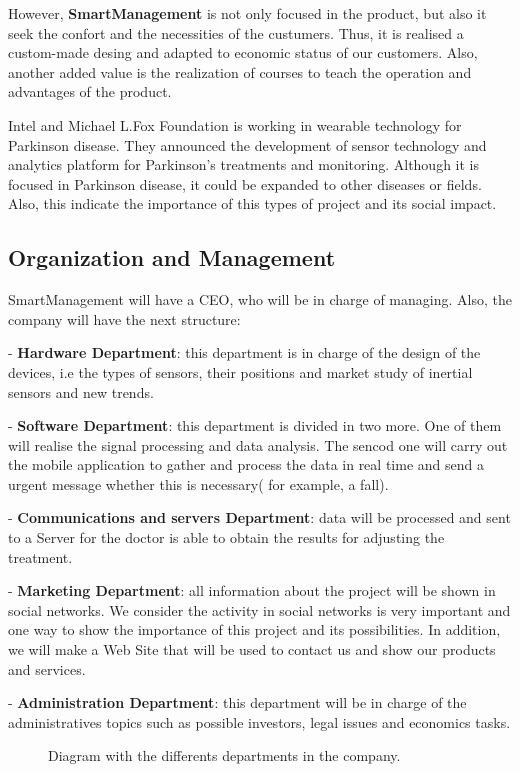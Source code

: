  However, \textbf{SmartManagement} is not only focused in the product, but also it seek the confort and the necessities of the custumers. Thus, it is realised a custom-made desing and adapted to economic status of our customers. Also, another added value is the realization of courses to teach the operation and advantages of the product.
 
 Intel and Michael L.Fox Foundation is working in wearable technology for Parkinson disease. They announced the development of sensor technology and analytics platform for Parkinson’s treatments and monitoring\cite{IntelAndMjf}. Although it is focused in Parkinson disease, it could be expanded to other diseases or fields. Also, this indicate the importance of this types of project and its social impact.

\vfill
\subsection{Organization and Management}
SmartManagement will have a CEO, who will be  in charge of managing. Also, the company will have the next structure:

-	\textbf{Hardware Department}: this department is in charge of the design of the devices, i.e the types of sensors, their  positions  and market study of inertial sensors and new trends.

-	\textbf{Software Department}: this department is divided in two more. One of them will realise the signal processing and data analysis. The sencod one will carry out the mobile application to gather and process the data in real time and send a urgent message whether this is necessary( for example, a fall).

-	\textbf{Communications and servers Department}: data will be processed and sent to a Server for the doctor is able to obtain the results for adjusting the treatment.

-	\textbf{Marketing Department}: all information about the project will be shown in  social networks. We consider the activity in social networks is very important and one way to show the importance of this project and its possibilities.
In addition, we will make a Web Site that will be used to contact us and show our products and services.

-	\textbf{Administration Department}: this department will be in charge of the administratives topics such as possible investors, legal issues and economics tasks.

\begin{figure}[H]
	\centering
	\caption{Diagram with the differents departments in the company.}
	\label{fig:Deparments}
\end{figure}

